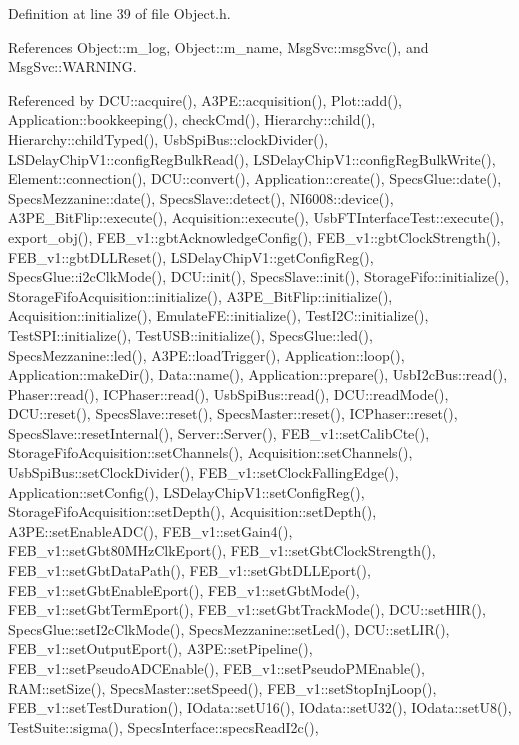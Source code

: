Definition at line 39 of file Object.\+h.



References Object\+::m\+\_\+log, Object\+::m\+\_\+name, Msg\+Svc\+::msg\+Svc(), and Msg\+Svc\+::\+W\+A\+R\+N\+I\+NG.



Referenced by D\+C\+U\+::acquire(), A3\+P\+E\+::acquisition(), Plot\+::add(), Application\+::bookkeeping(), check\+Cmd(), Hierarchy\+::child(), Hierarchy\+::child\+Typed(), Usb\+Spi\+Bus\+::clock\+Divider(), L\+S\+Delay\+Chip\+V1\+::config\+Reg\+Bulk\+Read(), L\+S\+Delay\+Chip\+V1\+::config\+Reg\+Bulk\+Write(), Element\+::connection(), D\+C\+U\+::convert(), Application\+::create(), Specs\+Glue\+::date(), Specs\+Mezzanine\+::date(), Specs\+Slave\+::detect(), N\+I6008\+::device(), A3\+P\+E\+\_\+\+Bit\+Flip\+::execute(), Acquisition\+::execute(), Usb\+F\+T\+Interface\+Test\+::execute(), export\+\_\+obj(), F\+E\+B\+\_\+v1\+::gbt\+Acknowledge\+Config(), F\+E\+B\+\_\+v1\+::gbt\+Clock\+Strength(), F\+E\+B\+\_\+v1\+::gbt\+D\+L\+L\+Reset(), L\+S\+Delay\+Chip\+V1\+::get\+Config\+Reg(), Specs\+Glue\+::i2c\+Clk\+Mode(), D\+C\+U\+::init(), Specs\+Slave\+::init(), Storage\+Fifo\+::initialize(), Storage\+Fifo\+Acquisition\+::initialize(), A3\+P\+E\+\_\+\+Bit\+Flip\+::initialize(), Acquisition\+::initialize(), Emulate\+F\+E\+::initialize(), Test\+I2\+C\+::initialize(), Test\+S\+P\+I\+::initialize(), Test\+U\+S\+B\+::initialize(), Specs\+Glue\+::led(), Specs\+Mezzanine\+::led(), A3\+P\+E\+::load\+Trigger(), Application\+::loop(), Application\+::make\+Dir(), Data\+::name(), Application\+::prepare(), Usb\+I2c\+Bus\+::read(), Phaser\+::read(), I\+C\+Phaser\+::read(), Usb\+Spi\+Bus\+::read(), D\+C\+U\+::read\+Mode(), D\+C\+U\+::reset(), Specs\+Slave\+::reset(), Specs\+Master\+::reset(), I\+C\+Phaser\+::reset(), Specs\+Slave\+::reset\+Internal(), Server\+::\+Server(), F\+E\+B\+\_\+v1\+::set\+Calib\+Cte(), Storage\+Fifo\+Acquisition\+::set\+Channels(), Acquisition\+::set\+Channels(), Usb\+Spi\+Bus\+::set\+Clock\+Divider(), F\+E\+B\+\_\+v1\+::set\+Clock\+Falling\+Edge(), Application\+::set\+Config(), L\+S\+Delay\+Chip\+V1\+::set\+Config\+Reg(), Storage\+Fifo\+Acquisition\+::set\+Depth(), Acquisition\+::set\+Depth(), A3\+P\+E\+::set\+Enable\+A\+D\+C(), F\+E\+B\+\_\+v1\+::set\+Gain4(), F\+E\+B\+\_\+v1\+::set\+Gbt80\+M\+Hz\+Clk\+Eport(), F\+E\+B\+\_\+v1\+::set\+Gbt\+Clock\+Strength(), F\+E\+B\+\_\+v1\+::set\+Gbt\+Data\+Path(), F\+E\+B\+\_\+v1\+::set\+Gbt\+D\+L\+L\+Eport(), F\+E\+B\+\_\+v1\+::set\+Gbt\+Enable\+Eport(), F\+E\+B\+\_\+v1\+::set\+Gbt\+Mode(), F\+E\+B\+\_\+v1\+::set\+Gbt\+Term\+Eport(), F\+E\+B\+\_\+v1\+::set\+Gbt\+Track\+Mode(), D\+C\+U\+::set\+H\+I\+R(), Specs\+Glue\+::set\+I2c\+Clk\+Mode(), Specs\+Mezzanine\+::set\+Led(), D\+C\+U\+::set\+L\+I\+R(), F\+E\+B\+\_\+v1\+::set\+Output\+Eport(), A3\+P\+E\+::set\+Pipeline(), F\+E\+B\+\_\+v1\+::set\+Pseudo\+A\+D\+C\+Enable(), F\+E\+B\+\_\+v1\+::set\+Pseudo\+P\+M\+Enable(), R\+A\+M\+::set\+Size(), Specs\+Master\+::set\+Speed(), F\+E\+B\+\_\+v1\+::set\+Stop\+Inj\+Loop(), F\+E\+B\+\_\+v1\+::set\+Test\+Duration(), I\+Odata\+::set\+U16(), I\+Odata\+::set\+U32(), I\+Odata\+::set\+U8(), Test\+Suite\+::sigma(), Specs\+Interface\+::specs\+Read\+I2c(), 